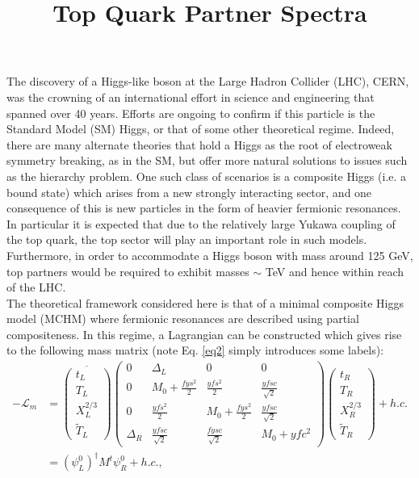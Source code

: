 \documentclass[a4paper]{article}
\begin{document}
\title{Top Quark Partner Spectra}
\maketitle
The discovery of a Higgs-like boson at the Large Hadron Collider (LHC), CERN, was the crowning of an international effort in science and engineering that spanned over 40 years. Efforts are ongoing to confirm if this particle is the Standard Model (SM) Higgs, or that of some other theoretical regime. Indeed, there are many alternate theories that hold a Higgs as the root of electroweak symmetry breaking, as in the SM, but offer more natural solutions to issues such as the hierarchy problem. One such class of scenarios is a composite Higgs (i.e. a bound state) which arises from a new strongly interacting sector, and one consequence of this is new particles in the form of heavier fermionic resonances. In particular it is expected that due to the relatively large Yukawa coupling of the top quark, the top sector will play an important role in such models. Furthermore, in order to accommodate a Higgs boson with mass around 125 GeV, top partners would be required to exhibit masses \(\sim\) TeV and hence within reach of the LHC. \\
\hfill\break
The theoretical framework considered here is that of a minimal composite Higgs model (MCHM) where fermionic resonances are described using partial compositeness. In this regime, a Lagrangian can be constructed which gives rise to the following mass matrix (note Eq. \eqref{eq2} simply introduces some labels): \\
\begin{align}
\label{eq1}
 -\mathcal{L}_{m} &= 
\overline{\begin{pmatrix}
t_{L} \\ T_{L} \\ X^{2/3}_{L} \\ \tilde{T}_{L}
\end{pmatrix}}
\begin{pmatrix}
0 & \Delta_{L} & 0 & 0 \\
0 & M_{0} + \frac{fys^{2}}{2} & \frac{yfs^{2}}{2} & \frac{yfsc}{\sqrt{2}} \\
0 & \frac{yfs^{2}}{2} & M_{0} + \frac{fys^{2}}{2} & \frac{yfsc}{\sqrt{2}} \\
\Delta_{R} & \frac{yfsc}{\sqrt{2}} & \frac{fysc}{\sqrt{2}} & M_{0} + yfc^{2}
\end{pmatrix}
\begin{pmatrix}
t_{R} \\ T_{R} \\ X^{2/3}_{R} \\ \tilde{T}_{R}
\end{pmatrix} + h.c. \\
\label{eq2}
&= \left(\psi_{L}^{0}\right)^\dag M^{t} \psi_{R}^{0} + h.c.,
\end{align}
\end{document}
